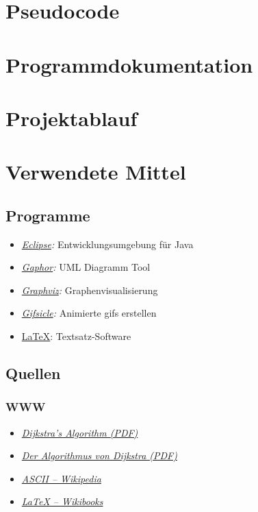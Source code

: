 \documentclass[a4paper,titlepage]{article}
\begin{document}
\newpage

\section{Pseudocode}

\newpage

\section{Programmdokumentation}

\newpage

\section{Projektablauf}

\newpage

\section{Verwendete Mittel}

\subsection{Programme}

\begin{itemize}
\item \emph{\href{http://www.eclipse.org}{Eclipse}:} Entwicklungsumgebung für Java
\item \emph{\href{http://gaphor.sourceforge.net}{Gaphor}:} UML Diagramm Tool
\item \emph{\href{http://graphviz.org}{Graphviz}:} Graphenvisualisierung
\item \emph{\href{http://www.lcdf.org/gifsicle}{Gifsicle}:} Animierte gifs erstellen
\item \href{http://www.latex-project.org}{\LaTeX}: Textsatz-Software
\end{itemize}

\subsection{Quellen}

\subsubsection{WWW}

\begin{itemize}
\item \emph{\href{http://ocw.mit.edu/NR/rdonlyres/Sloan-School-of-Management/15-082JNetwork-OptimizationSpring2003/FC13EFA1-0FE2-4BFB-B019-8939606EDDCC/0/dijkstrasalgorithm.pdf}{Dijkstra’s Algorithm (PDF)}}
\item \emph{\href{http://www.educ.ethz.ch/lehrpersonen/informatik/unterrichtsmaterialien_inf/kommuniation_kryptographie/routing/la3.pdf}{Der Algorithmus von Dijkstra (PDF)}}
\item \emph{\href{http://en.wikipedia.org/wiki/ASCII}{ASCII -- Wikipedia}}
\item \emph{\href{http://en.wikibooks.org/wiki/LaTeX}{LaTeX -- Wikibooks}}
\end{itemize}
\end{document}

